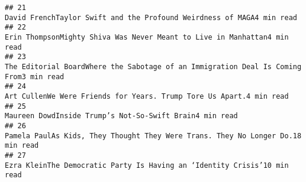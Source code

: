 \documentclass[
]{article}
\begin{document}
\begin{verbatim}
## 21                                                                                                                                                                                                                                                                                                                                                 David FrenchTaylor Swift and the Profound Weirdness of MAGA4 min read
## 22                                                                                                                                                                                                                                                                                                                                              Erin ThompsonMighty Shiva Was Never Meant to Live in Manhattan4 min read
## 23                                                                                                                                                                                                                                                                                                                                 The Editorial BoardWhere the Sabotage of an Immigration Deal Is Coming From3 min read
## 24                                                                                                                                                                                                                                                                                                                                                   Art CullenWe Were Friends for Years. Trump Tore Us Apart.4 min read
## 25                                                                                                                                                                                                                                                                                                                                                               Maureen DowdInside Trump’s Not-So-Swift Brain4 min read
## 26                                                                                                                                                                                                                                                                                                                                       Pamela PaulAs Kids, They Thought They Were Trans. They No Longer Do.18 min read
## 27                                                                                                                                                                                                                                                                                                                                              Ezra KleinThe Democratic Party Is Having an ‘Identity Crisis’10 min read

\end{verbatim}
\end{document}
